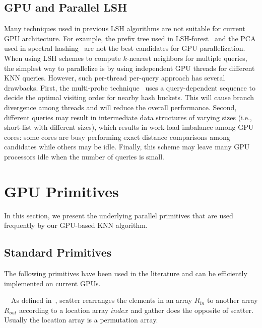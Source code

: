 \subsection{GPU and Parallel LSH}
Many techniques used in previous LSH algorithms are not suitable for current GPU architecture. For example, the prefix tree used in LSH-forest~\cite{Bawa:2005:LFS} and the PCA used in spectral hashing~\cite{weiss:nips:2008} are not the best candidates for GPU parallelization. When using LSH schemes to compute $k$-nearest neighbors for multiple queries, the simplest way to parallelize is by using independent GPU threads for different KNN queries.
However, such per-thread per-query approach has several drawbacks. First, the multi-probe technique~\cite{Lv:2007:MLE} uses a query-dependent sequence to decide the optimal visiting order for nearby hash buckets. This will cause branch divergence among threads and will reduce the overall performance. Second, different queries may result in intermediate data structures of varying sizes (i.e., short-list with different sizes), which results in work-load imbalance among GPU cores: some cores are busy performing exact distance comparisons among candidates while others may be idle. Finally, this scheme may leave many GPU processors idle when the number of queries is small.

\section{GPU Primitives}
\label{sec:6:primitive}
In this section, we present the underlying parallel primitives that are used frequently by our GPU-based KNN algorithm.

\subsection{Standard Primitives}
The following primitives have been used in the literature and can be efficiently implemented on current GPUs.

 \ \ As defined in~\cite{He:2007:EGS}, scatter rearranges the elements in an array $R_{in}$ to another array $R_{out}$ according to a location array $index$ and gather does the opposite of scatter. Usually the location array is a permutation array.

\noindent {}

